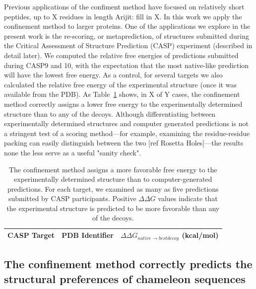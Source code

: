 \documentclass[12pt]{article}
\newcommand{\Justin}[1]{\color{blue}#1\normalcolor}
\begin{document}
Previous applications of the confiment method have focused on relatively short peptides, up to X
residues in length \Justin{Arijit: fill in X}. In this work we apply the confinement method to
larger proteins. One of the  applications we explore in the present work is the re-scoring, or
metaprediction, of structures submitted during the Critical Assessment of Structure Prediction
(CASP) experiment (described in detail later). We computed the relative free energies of predictions
submitted during CASP9 and 10, with the expectation that the most native-like prediction will have
the lowest free energy. As a control, for several targets we also calculated the relative free
energy of the experimental structure (once it was available from the PDB). As
Table~\ref{table:casp_control} shows, in X of Y cases, the confinement method correctly assigns a
lower free energy to the experimentally determined structure than to any of the decoys. Although
differentiating between experimentally determined structures and computer generated predictions is
not a stringent test of a scoring method---for example, examining the residue-residue packing can
easily distinguish between the two [ref Rosetta Holes]---the results none the less serve as a useful
"sanity check".

\begin{table}
\label{table:casp_control}

\begin{center}
\begin{tabular}{l l l}\hline
    CASP Target  & PDB Identifier & $\Delta\Delta G_{native \to best decoy}$ (kcal/mol) \\ \hline
\end{tabular}
\end{center}

\caption{The confinement method assigns a more favorable free energy to the experimentally
determined structure than to computer-generated predictions. For each target, we examined as many as
five predictions submitted by CASP participants. Positive $\Delta\Delta G$ values indicate that the
experimental structure is predicted to be more favorable than any of the decoys.}

\end{table}


\subsection{The confinement method correctly predicts the structural preferences of chameleon
sequences}
\end{document}
